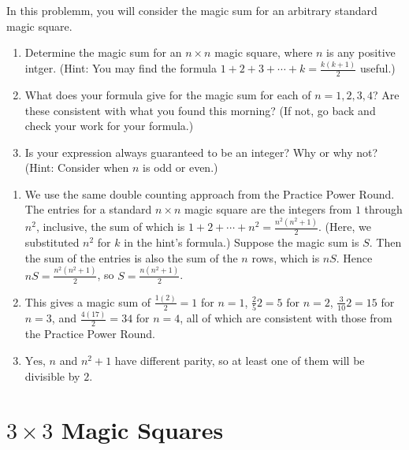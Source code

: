 \documentclass[11pt]{article}
\renewenvironment{problem}{\begin{problems}}{\end{problems}\vspace{5pt}}
\begin{document}
\begin{problem}[5=3+1+1 points]
In this problemm, you will consider the magic sum for an arbitrary standard magic square.
\begin{enumerate}[label=(\alph*)]
\item Determine the magic sum for an $n \times n$ magic square, where $n$ is any positive intger.
(Hint: You may find the formula $1 + 2 + 3 + \cdots + k = \frac{k(k+1)}{2}$ useful.)

\item What does your formula give for the magic sum for each of $n = 1, 2, 3, 4$?
Are these consistent with what you found this morning?
(If not, go back and check your work for your formula.)

\item Is your expression always guaranteed to be an integer? Why or why not? (Hint: Consider when $n$ is odd
or even.)
\end{enumerate}
\end{problem}

\begin{solution}
\begin{enumerate}[label=(\alph*)]
\item We use the same double counting approach from the Practice Power Round. The entries for a standard
$n \times n$ magic square are the integers from $1$ through $n^2$, inclusive, the sum of which is
$1 + 2 + \cdots + n^2 = \frac{n^2(n^2+1)}{2}$. (Here, we substituted $n^2$ for $k$ in the hint's formula.)
Suppose the magic sum is $S$. Then the sum of the entries is also the sum of the $n$ rows, which is $nS$.
Hence $nS = \frac{n^2(n^2+1)}{2}$, so $S = \boxed{\frac{n(n^2+1)}{2}}$.

\item This gives a magic sum of $\frac{1(2)}{2} = 1$ for $n = 1$, $\frac{2}{5}{2} = 5$ for $n = 2$,
$\frac{3}{10}{2} = 15$ for $n = 3$, and $\frac{4(17)}{2} = 34$ for $n = 4$, all of which are consistent
with those from the Practice Power Round.

\item $\boxed{\text{Yes}}$, $n$ and $n^2+1$ have different parity, so at least one of them will be divisible by $2$.
\end{enumerate}
\end{solution}


\section{$3 \times 3$ Magic Squares}
\end{document}
